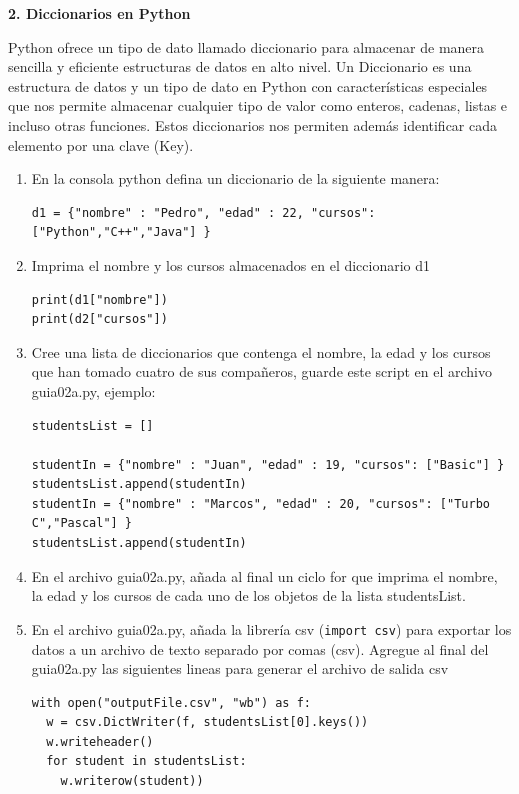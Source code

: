 \documentclass[10pt,letterpaper]{article}
\begin{document}
\begin{center}
\textbf{2. Diccionarios en Python}
\end{center}

Python ofrece un tipo de dato llamado diccionario para almacenar de manera sencilla y eficiente estructuras de datos en alto nivel. Un Diccionario es una estructura de datos y un tipo de dato en Python con características especiales que nos permite almacenar cualquier tipo de valor como enteros, cadenas, listas e incluso otras funciones. Estos diccionarios nos permiten además identificar cada elemento por una clave (Key).

\begin{enumerate}
\item En la consola python defina un diccionario de la siguiente manera: 
\begin{verbatim}
d1 = {"nombre" : "Pedro", "edad" : 22, "cursos": ["Python","C++","Java"] }
\end{verbatim}

\item Imprima el nombre y los cursos almacenados en el diccionario d1
\begin{verbatim}
print(d1["nombre"])
print(d2["cursos"])
\end{verbatim}

\item Cree una lista de diccionarios que contenga el nombre, la edad y los cursos que han tomado cuatro de sus compañeros, guarde este script en el archivo guia02a.py, ejemplo: 
\begin{verbatim}
studentsList = []

studentIn = {"nombre" : "Juan", "edad" : 19, "cursos": ["Basic"] }
studentsList.append(studentIn)
studentIn = {"nombre" : "Marcos", "edad" : 20, "cursos": ["Turbo C","Pascal"] }
studentsList.append(studentIn)
\end{verbatim}


\item En el archivo guia02a.py, añada al final un ciclo for que imprima el nombre, la edad y los cursos de cada uno de los objetos de la lista studentsList.

\item En el archivo guia02a.py, añada la librería csv (\verb|import csv|) para exportar los datos a un archivo de texto separado por comas (csv). Agregue al final del guia02a.py las siguientes lineas para generar el archivo de salida csv
\begin{verbatim}
with open("outputFile.csv", "wb") as f:
  w = csv.DictWriter(f, studentsList[0].keys())
  w.writeheader()
  for student in studentsList:
    w.writerow(student))
\end{verbatim}


\end{enumerate}
\end{document}
